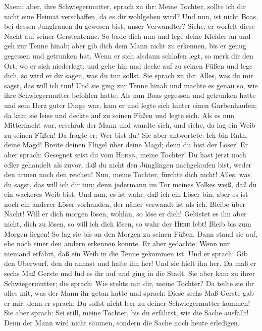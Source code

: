  Naemi aber, ihre Schwiegermutter, sprach zu ihr: Meine
Tochter, sollte ich dir nicht eine Heimat verschaffen, da es dir
wohlgehen wird?  Und nun, ist nicht Boas, bei dessen
Jungfrauen du gewesen bist, unser Verwandter? Siehe, er worfelt diese
Nacht auf seiner Gerstentenne.  So bade dich nun und lege
deine Kleider an und geh zur Tenne hinab; aber gib dich dem Mann nicht
zu erkennen, bis er genug gegessen und getrunken hat. 
Wenn er sich alsdann schlafen legt, so merk dir den Ort, wo er sich
niederlegt, und gehe hin und decke auf zu seinen Füßen und lege dich, so
wird er dir sagen, was du tun sollst.  Sie sprach zu ihr:
Alles, was du mir sagst, das will ich tun!  Und sie ging
zur Tenne hinab und machte es genau so, wie ihre Schwiegermutter
befohlen hatte.  Als nun Boas gegessen und getrunken hatte
und sein Herz guter Dinge war, kam er und legte sich hinter einen
Garbenhaufen; da kam sie leise und deckte auf zu seinen Füßen und legte
sich.  Als es nun Mitternacht war, erschrak der Mann und
wandte sich, und siehe, da lag ein Weib zu seinen Füßen! Da fragte er:
Wer bist du?  Sie aber antwortete: Ich bin Ruth, deine
Magd! Breite deinen Flügel über deine Magd; denn du bist der Löser!
 Er aber sprach: Gesegnet seist du vom \textsc{Herrn},
meine Tochter! Du hast jetzt noch edler gehandelt als zuvor, daß du
nicht den Jünglingen nachgelaufen bist, weder den armen noch den
reichen!  Nun, meine Tochter, fürchte dich nicht! Alles,
was du sagst, das will ich dir tun; denn jedermann im Tor meines Volkes
weiß, daß du ein wackeres Weib bist.  Und nun, es ist
wahr, daß ich ein Löser bin; aber es ist noch ein anderer Löser
vorhanden, der näher verwandt ist als ich.  Bleibe über
Nacht! Will er dich morgen lösen, wohlan, so löse er dich! Gelüstet es
ihn aber nicht, dich zu lösen, so will ich dich lösen, so wahr der
\textsc{Herr} lebt!  Bleib bis zum Morgen liegen! So lag
sie bis an den Morgen zu seinen Füßen. Dann stand sie auf, ehe noch
einer den andern erkennen konnte. Er aber gedachte: Wenn nur niemand
erfährt, daß ein Weib in die Tenne gekommen ist.  Und er
sprach: Gib den Überwurf, den du anhast und halte ihn her! Und sie hielt
ihn her. Da maß er sechs Maß Gerste und lud es ihr auf und ging in die
Stadt.  Sie aber kam zu ihrer Schwiegermutter; die
sprach: Wie steht\textquotesingle s mit dir, meine Tochter? Da teilte
sie ihr alles mit, was der Mann ihr getan hatte und sprach:
 Diese sechs Maß Gerste gab er mir; denn er sprach: Du
sollst nicht leer zu deiner Schwiegermutter kommen!  Sie
aber sprach: Sei still, meine Tochter, bis du erfährst, wie die Sache
ausfällt! Denn der Mann wird nicht säumen, sondern die Sache noch heute
erledigen.

